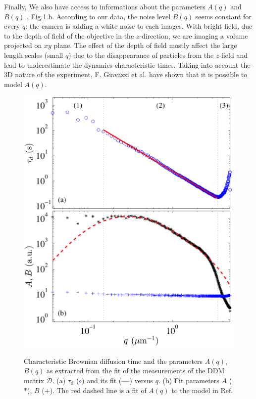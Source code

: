 \documentclass[prb,reprint,amsmath,amssymb]{revtex4-1}
\newcommand{\tg}[1]{{\color{magenta}#1}} %
\begin{document}
Finally, We also have access to informations about the parameters $A(q)$ and $B(q)$ , Fig.\ref{fig:FitDiffColl}.b. According to our data, the noise level $B(q)$ seems constant for every $q$: the camera is adding a white noise to each images. With bright field, due to the depth of field of the objective in the $z$-direction, we are imaging a volume projected on $xy$ plane. The effect of the depth of field mostly affect the large length scales (small $q$) due to the disappearance of particles from the $z$-field and lead to underestimate the dynamics characteristic times\cite {4_Martinez20121637}. Taking into account the 3D nature of the experiment,  F. Giavazzi et al.\citep{3_DDM3D} have shown that it is possible to model $A(q)$.

\begin{figure}
	\includegraphics[width=\linewidth]{DiffusionColloids.pdf}\\
	\caption{Characteristic Brownian diffusion time and the parameters $A(q)$, $B(q)$ \tg{as extracted from the fit of the measurements of the DDM matrix $\mathcal{D}$. (a) $\tau_\text{d}$ (\textcolor{blue}{$\circ$}) and its fit (\textcolor{red}{\textbf{---}}) versus $q$. (b) Fit parameters $A$ ($\ast$), $B$ (\textcolor{blue}{+}). The red dashed line is a fit of $A(q)$ to the model in Ref\citep{3_DDM3D}.} }
	\label{fig:FitDiffColl}
\end{figure}
\end{document}
